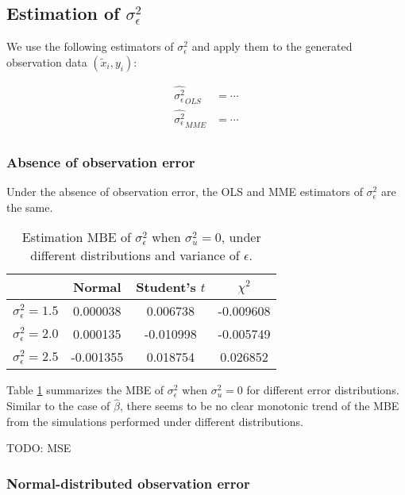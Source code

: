 \documentclass{article}
\begin{document}
\subsection{Estimation of $\sigma^2_\epsilon$}

We use the following estimators of $\sigma^2_\epsilon$ and apply them to the generated observation data $(\tilde{x}_i, y_i)$:

\begin{equation}
    \begin{split}
        \hat{\sigma^2_\epsilon}_{OLS} &= \cdots\\
        \hat{\sigma^2_\epsilon}_{MME} &= \cdots\\
    \end{split}
\end{equation}

\subsubsection{Absence of observation error}

Under the absence of observation error, the OLS and MME estimators of $\sigma^2_\epsilon$ are the same.

\begin{table}[ht]
    \centering
    \caption{Estimation MBE of $\sigma^2_\epsilon$ when $\sigma^2_u=0$, under different distributions and variance of $\epsilon$.}
    \label{Tab:MBE_sigma_absence}
    \begin{tabular}[t]{lccc}
        \hline
        &Normal&Student's $t$&$\chi^2$\\
        \hline
        $\sigma^2_\epsilon = 1.5$&0.000038&0.006738&-0.009608\\
        $\sigma^2_\epsilon = 2.0$&0.000135&-0.010998&-0.005749\\
        $\sigma^2_\epsilon = 2.5$&-0.001355&0.018754& 0.026852\\
        \hline
    \end{tabular}
\end{table}

Table \ref{Tab:MBE_sigma_absence} summarizes the MBE of $\sigma^2_\epsilon$ when $\sigma^2_u=0$ for different error distributions.
Similar to the case of $\hat{\beta}$, there seems to be no clear monotonic trend of the MBE from the simulations performed under different distributions. 

TODO: MSE

\subsubsection{Normal-distributed observation error}
\end{document}
